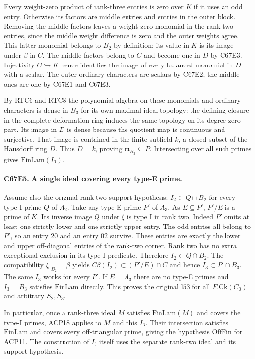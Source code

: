Every weight-zero product of rank-three entries is zero over $K$
if it uses an odd entry. Otherwise its factors are middle entries
and entries in the outer block. Removing the middle factors leaves
a weight-zero monomial in the rank-two entries, since the middle
weight difference is zero and the outer weights agree. This latter
monomial belongs to $B_2$ by definition; its value in $K$ is its
image under $\beta$ in $C$. The middle factors belong to $C$ and
become one in $D$ by C67E3. Injectivity $C\hookrightarrow K$ hence
identifies the image of every balanced monomial in $D$ with a
scalar. The outer ordinary characters are scalars by C67E2; the
middle ones are one by C67E1 and C67E3.

By RTC6 and RTC8 the polynomial algebra on these monomials and
ordinary characters is dense in $B_3$ for its own maximal-ideal
topology: the defining closure in the complete deformation ring
induces the same topology on its degree-zero part. Its image in
$D$ is dense because the quotient map is continuous and
surjective. That image is contained in the finite subfield $k$,
a closed subset of the Hausdorff ring $D$. Thus $D=k$, proving
$\mathfrak m_{B_3}\subseteq P$. Intersecting over all such primes
gives $\mathrm{FinLam}(I_3)$.

\paragraph{C67E5. A single ideal covering every type-E prime.}
Assume also the original rank-two support hypothesis:
$I_2\subset Q\cap B_2$ for every type-I prime $Q$ of $A_2$.
Take any type-E prime $P'$ of $A_3$. As $E\subseteq P'$,
$P'/E$ is a prime of $K$. Its inverse image $Q$ under $\xi$
is type I in rank two. Indeed $P'$ omits at least one strictly
lower and one strictly upper entry. The odd entries all belong
to $P'$, so an entry $20$ and an entry $02$ survive. These entries
are exactly the lower and upper off-diagonal entries of the rank-two
corner. Rank two has no extra exceptional exclusion in its type-I
predicate. Therefore $I_2\subset Q\cap B_2$. The compatibility
$\xi|_{B_2}=\beta$ yields $C\beta(I_2)\subset (P'/E)\cap C$
and hence $I_3\subset P'\cap B_3$. The same $I_3$ works for every
$P'$. If $E=A_3$ there are no type-E primes and $I_3=B_3$ satisfies
$\mathrm{FinLam}$ directly. This proves the original $\mathrm{l53}$
for all $F.\mathrm{Ok}(C_0)$ and arbitrary $S_2,S_3$.

In particular, once a rank-three ideal $M$ satisfies
$\mathrm{FinLam}(M)$ and covers the type-I primes, ACP18 applies
to $M$ and this $I_3$. Their intersection satisfies
$\mathrm{FinLam}$ and covers every off-triangular prime, giving
the hypothesis $\mathrm{OffFin}$ for ACP11. The construction of
$I_3$ itself uses the separate rank-two ideal and its support
hypothesis.
